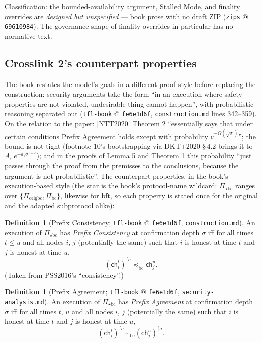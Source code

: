 \documentclass[11pt,a4paper]{article}
\theoremstyle{definition}
\newtheorem{definition}[theorem]{Definition}
\begin{document}
Classification: the bounded-availability argument, Stalled Mode, and
finality overrides are \emph{designed but unspecified} --- book prose with
no draft ZIP (\texttt{zips} @ \texttt{69610984}). The governance shape of
finality overrides in particular has no normative text.

\subsection{Crosslink 2's counterpart properties}
\label{sec:xl-counterparts}

The book restates the model's goals in a different proof style before
replacing the construction: security arguments take the form ``in an
execution where safety properties are not violated, undesirable thing
cannot happen'', with probabilistic reasoning separated out
(\texttt{tfl-book} @ \texttt{fe6e1d6f}, \texttt{construction.md} lines
342--359). On the relation to the paper: [NTT2020] Theorem 2
``essentially says that under certain conditions Prefix Agreement holds
except with probability $e^{-\Omega(\sqrt{\sigma})}$''; the bound is not
tight (footnote 10's bootstrapping via DKT+2020 \S\,4.2 brings it to
$A_\varepsilon\, e^{-a_\varepsilon \sigma^{1-\varepsilon}}$); and in the
proofs of Lemma 5 and Theorem 1 this probability ``just passes through
the proof from the premisses to the conclusions, because the argument is
not probabilistic''. The counterpart properties, in the book's
execution-based style (the star is the book's protocol-name wildcard:
$\Pi_{\star\mathrm{bc}}$ ranges over
$\{\Pi_{\mathrm{origbc}}, \Pi_{\mathrm{bc}}\}$, likewise for bft, so
each property is stated once for the original and the adapted
subprotocol alike):

\begin{definition}[Prefix Consistency; \texttt{tfl-book} @
\texttt{fe6e1d6f}, \texttt{construction.md}]\label{def:xl-prefix-consistency-ntt}
An execution of $\Pi_{\star\mathrm{bc}}$ has \emph{Prefix Consistency}
at confirmation depth $\sigma$ iff for all times $t \le u$ and all nodes
$i$, $j$ (potentially the same) such that $i$ is honest at time $t$ and
$j$ is honest at time $u$,
\[
(\mathsf{ch}_i^t)^{\lceil\sigma} \preceq_{\mathrm{bc}} \mathsf{ch}_j^u.
\]
(Taken from PSS2016's ``consistency''.)
\end{definition}

\begin{definition}[Prefix Agreement; \texttt{tfl-book} @
\texttt{fe6e1d6f}, \texttt{security-analysis.md}]
\label{def:xl-prefix-agreement-ntt}
An execution of $\Pi_{\star\mathrm{bc}}$ has \emph{Prefix Agreement} at
confirmation depth $\sigma$ iff for all times $t$, $u$ and all nodes $i$,
$j$ (potentially the same) such that $i$ is honest at time $t$ and $j$ is
honest at time $u$,
\[
(\mathsf{ch}_i^t)^{\lceil\sigma} \sim_{\mathrm{bc}}
(\mathsf{ch}_j^u)^{\lceil\sigma}.
\]
\end{definition}
\end{document}
